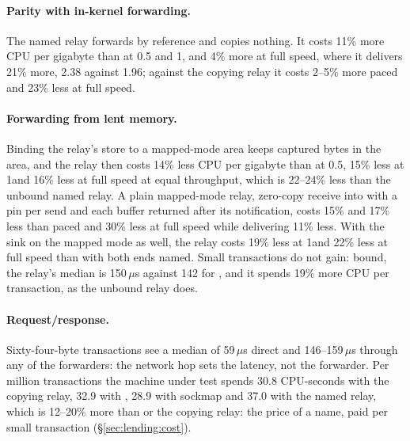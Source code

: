 \paragraph{Parity with in-kernel forwarding.} The named relay forwards by reference and copies
nothing. It costs
11\% more CPU per gigabyte than \splice at 0.5 and 1\GBs, and 4\% more at full speed, where
it delivers 21\% more, 2.38 against 1.96\GBs; against the copying relay it costs 2--5\% more
paced and 23\% less at full speed. %

\paragraph{Forwarding from lent memory.} Binding the relay's store to a mapped-mode area keeps
captured bytes in the area, and the relay then costs
14\% less CPU per gigabyte than \splice at 0.5\GBs, 15\% less at 1\GBs and 16\% less at
full speed at equal throughput, which is 22--24\% less than the unbound named relay. A plain
mapped-mode relay, zero-copy receive into \sendzc with a pin per send and each buffer returned
after its notification, costs 15\% and 17\% less than
\splice paced and 30\% less at full speed while delivering 11\% less. With the sink on the
mapped mode as well, the relay costs 19\% less at 1\GBs and 22\% less at full speed than
with both ends named. Small transactions do not gain: bound, the relay's median is
150\,$\mu$s against 142 for \splice, and it spends 19\% more CPU per transaction, as the
unbound relay does. %

\paragraph{Request/response.} Sixty-four-byte transactions see a median of 59\,$\mu$s
direct and 146--159\,$\mu$s through any of the forwarders: the network hop sets the latency,
not the forwarder. Per million transactions the machine under test spends 30.8 CPU-seconds
with the copying relay, 32.9 with \splice, 28.9 with sockmap and 37.0 with the named relay,
which is 12--20\% more than \splice or the copying relay: the price of a name, paid per small
transaction (\S\ref{sec:lending:cost}). %

